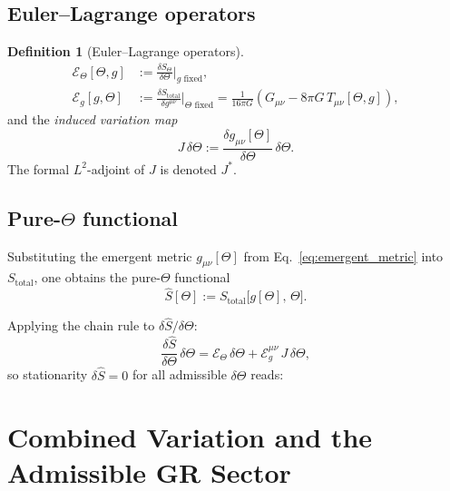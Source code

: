 \documentclass[12pt]{article}
\theoremstyle{definition}
\newtheorem{definition}[theorem]{Definition}
\theoremstyle{remark}
\begin{document}
\subsection{Euler--Lagrange operators}
\label{subsec:el_ops}

\begin{definition}[Euler--Lagrange operators]
\label{def:el_operators}
\begin{align}
  \mathcal{E}_\Theta[\Theta, g]
  &:= \frac{\delta S_\Theta}{\delta\Theta}\bigg|_{g \text{ fixed}},
  \label{eq:E_Theta}\\[4pt]
  \mathcal{E}_g[g, \Theta]
  &:= \frac{\delta S_{\text{total}}}{\delta g^{\mu\nu}}\bigg|_{\Theta \text{ fixed}}
   = \frac{1}{16\pi G}\!\left(G_{\mu\nu} - 8\pi G\, T_{\mu\nu}[\Theta,g]\right),
  \label{eq:E_g}
\end{align}
and the \emph{induced variation map}
\begin{equation}
  J\,\delta\Theta := \frac{\delta g_{\mu\nu}[\Theta]}{\delta\Theta}\,\delta\Theta.
  \label{eq:J_map}
\end{equation}
The formal $L^2$-adjoint of $J$ is denoted $J^*$.
\end{definition}

\subsection{Pure-$\Theta$ functional}

Substituting the emergent metric $g_{\mu\nu}[\Theta]$ from
Eq.~\eqref{eq:emergent_metric} into $S_{\text{total}}$, one obtains the
pure-$\Theta$ functional
\begin{equation}
  \hat{S}[\Theta] := S_{\text{total}}\bigl[g[\Theta],\,\Theta\bigr].
  \label{eq:S_hat}
\end{equation}

Applying the chain rule to $\delta\hat{S}/\delta\Theta$:
\begin{equation}
  \frac{\delta\hat{S}}{\delta\Theta}\,\delta\Theta
  = \mathcal{E}_\Theta\,\delta\Theta
  + \mathcal{E}_g^{\mu\nu}\,J\,\delta\Theta,
  \label{eq:variation_chain}
\end{equation}
so stationarity $\delta\hat{S} = 0$ for all admissible $\delta\Theta$ reads:

\section{Combined Variation and the Admissible GR Sector}
\label{sec:combined_variation}
\end{document}

